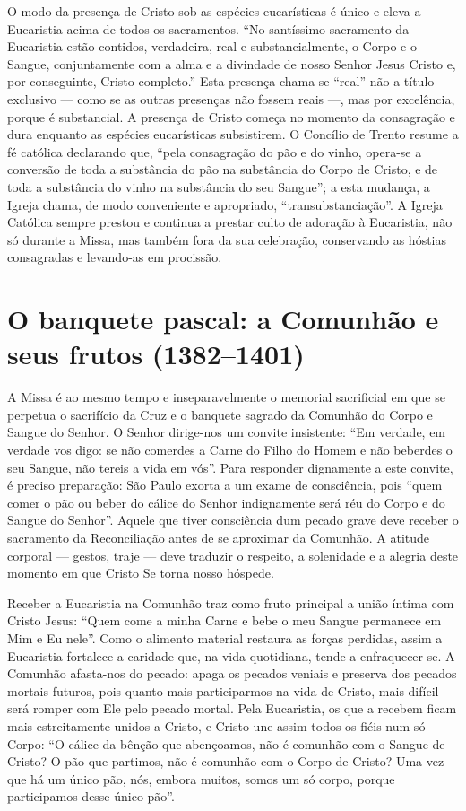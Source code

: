 O modo da presença de Cristo sob as espécies eucarísticas é único e eleva a Eucaristia acima de todos os sacramentos. ``No santíssimo sacramento da Eucaristia estão contidos, verdadeira, real e substancialmente, o Corpo e o Sangue, conjuntamente com a alma e a divindade de nosso Senhor Jesus Cristo e, por conseguinte, Cristo completo.'' Esta presença chama-se ``real'' não a título exclusivo --- como se as outras presenças não fossem reais ---, mas por excelência, porque é substancial. A presença de Cristo começa no momento da consagração e dura enquanto as espécies eucarísticas subsistirem. O Concílio de Trento resume a fé católica declarando que, ``pela consagração do pão e do vinho, opera-se a conversão de toda a substância do pão na substância do Corpo de Cristo, e de toda a substância do vinho na substância do seu Sangue''; a esta mudança, a Igreja chama, de modo conveniente e apropriado, ``transubstanciação''. A Igreja Católica sempre prestou e continua a prestar culto de adoração à Eucaristia, não só durante a Missa, mas também fora da sua celebração, conservando as hóstias consagradas e levando-as em procissão.

\section{O banquete pascal: a Comunhão e seus frutos (1382--1401)}

A Missa é ao mesmo tempo e inseparavelmente o memorial sacrificial em que se perpetua o sacrifício da Cruz e o banquete sagrado da Comunhão do Corpo e Sangue do Senhor. O Senhor dirige-nos um convite insistente: ``Em verdade, em verdade vos digo: se não comerdes a Carne do Filho do Homem e não beberdes o seu Sangue, não tereis a vida em vós''. Para responder dignamente a este convite, é preciso preparação: São Paulo exorta a um exame de consciência, pois ``quem comer o pão ou beber do cálice do Senhor indignamente será réu do Corpo e do Sangue do Senhor''. Aquele que tiver consciência dum pecado grave deve receber o sacramento da Reconciliação antes de se aproximar da Comunhão. A atitude corporal --- gestos, traje --- deve traduzir o respeito, a solenidade e a alegria deste momento em que Cristo Se torna nosso hóspede.

Receber a Eucaristia na Comunhão traz como fruto principal a união íntima com Cristo Jesus: ``Quem come a minha Carne e bebe o meu Sangue permanece em Mim e Eu nele''. Como o alimento material restaura as forças perdidas, assim a Eucaristia fortalece a caridade que, na vida quotidiana, tende a enfraquecer-se. A Comunhão afasta-nos do pecado: apaga os pecados veniais e preserva dos pecados mortais futuros, pois quanto mais participarmos na vida de Cristo, mais difícil será romper com Ele pelo pecado mortal. Pela Eucaristia, os que a recebem ficam mais estreitamente unidos a Cristo, e Cristo une assim todos os fiéis num só Corpo: ``O cálice da bênção que abençoamos, não é comunhão com o Sangue de Cristo? O pão que partimos, não é comunhão com o Corpo de Cristo? Uma vez que há um único pão, nós, embora muitos, somos um só corpo, porque participamos desse único pão''.


